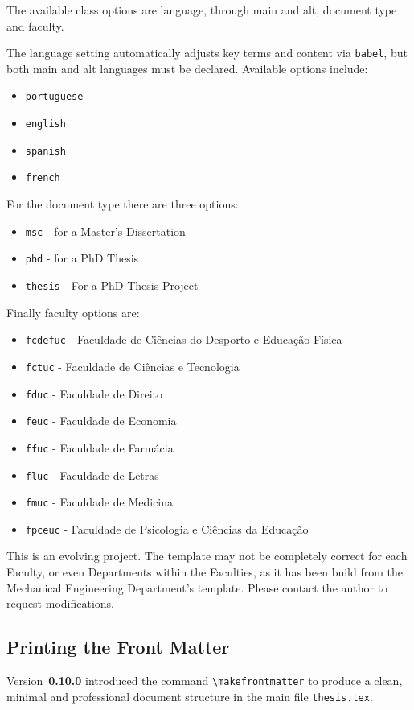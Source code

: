 The available class options are language, through main and alt, document type and faculty.

The language setting automatically adjusts key terms and content via \texttt{babel}, but both main and alt languages must be declared. Available options include:
\begin{itemize}
    \item \texttt{portuguese}
    \item \texttt{english}
    \item \texttt{spanish}
    \item \texttt{french}
\end{itemize}

For the document type there are three options:
\begin{itemize}
    \item \texttt{msc} - for a Master's Dissertation
    \item \texttt{phd} - for a PhD Thesis
    \item \texttt{thesis} - For a PhD Thesis Project
\end{itemize}

Finally faculty options are:
\begin{itemize}
    \item \texttt{fcdefuc} - Faculdade de Ciências do Desporto e Educação Física
    \item \texttt{fctuc} - Faculdade de Ciências e Tecnologia
    \item \texttt{fduc} - Faculdade de Direito
    \item \texttt{feuc} - Faculdade de Economia
    \item \texttt{ffuc} - Faculdade de Farmácia
    \item \texttt{fluc} - Faculdade de Letras
    \item \texttt{fmuc} - Faculdade de Medicina
    \item \texttt{fpceuc} - Faculdade de Psicologia e Ciências da Educação
\end{itemize}

This is an evolving project. The template may not be completely correct for each Faculty, or even Departments within the Faculties, as it has been build from the Mechanical Engineering Department's template. Please contact the author to request modifications.

\subsection{Printing the Front Matter}
Version~\textbf{0.10.0} introduced the command \verb|\makefrontmatter| to produce a clean, minimal and professional document structure in the main file \texttt{thesis.tex}.

